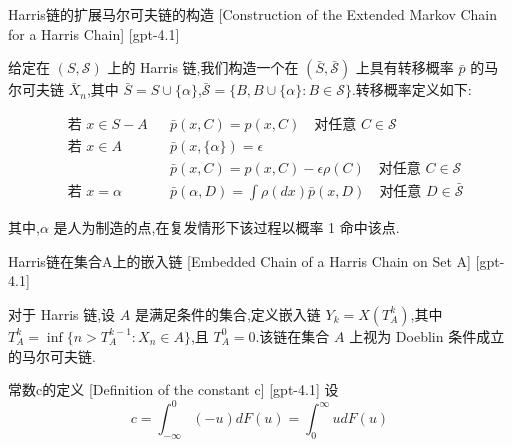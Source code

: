 \documentclass[UTF8]{ctexart}
\begin{document}
    
    
    \begin{dfn}
        {Harris链的扩展马尔可夫链的构造}
        [Construction of the Extended Markov Chain for a Harris Chain]
        [gpt-4.1]
        
给定在 $(S, \mathcal{S})$ 上的 Harris 链,我们构造一个在 $({\bar{S}}, {\bar{\mathcal{S}}})$ 上具有转移概率 $\bar{p}$ 的马尔可夫链 $\bar{X}_{n}$,其中 ${\bar{S}} = S \cup \{\alpha\}$,$\bar{\mathcal{S}} = \{ B, B \cup \{\alpha\} : B \in \mathcal{S} \}$.转移概率定义如下:

\[
\begin{array}{rlrl}
& \text{若 } x \in S - A & & \bar{p}(x, C) = p(x, C) \quad \text{对任意 } C \in \mathcal{S} \\
& \text{若 } x \in A & & \bar{p}(x, \{\alpha\}) = \epsilon \\
& & & \bar{p}(x, C) = p(x, C) - \epsilon \rho(C) \quad \text{对任意 } C \in \mathcal{S} \\
& \text{若 } x = \alpha & & \bar{p}(\alpha, D) = \int \rho(dx) \bar{p}(x, D) \quad \text{对任意 } D \in \bar{\mathcal{S}}
\end{array}
\]

其中,$\alpha$ 是人为制造的点,在复发情形下该过程以概率 1 命中该点.

    \end{dfn}
    
    
    
    \begin{dfn}
        {Harris链在集合A上的嵌入链}
        [Embedded Chain of a Harris Chain on Set A]
        [gpt-4.1]
        
对于 Harris 链,设 $A$ 是满足条件的集合,定义嵌入链 $Y_{k} = X(T_{A}^{k})$,其中 $T_{A}^{k} = \operatorname{inf}\{ n > T_{A}^{k-1} : X_{n} \in A \}$,且 $T_{A}^{0} = 0$.该链在集合 $A$ 上视为 Doeblin 条件成立的马尔可夫链.

    \end{dfn}
    
    
    
    \begin{dfn}
        {常数c的定义}
        [Definition of the constant c]
        [gpt-4.1]
        设
\[
c = \int_{-\infty}^0 (-u) dF(u) = \int_0^{\infty} 
u dF(
u)
\]

    \end{dfn}
    
\end{document}
